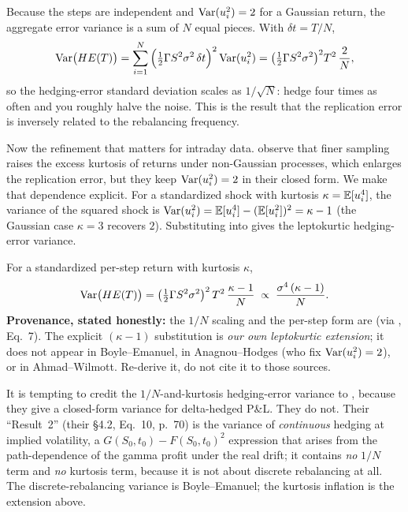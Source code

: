 Because the steps are independent and $\operatorname{Var}(u_i^2) = 2$ for a Gaussian return, the aggregate error variance is a sum of $N$ equal pieces. With $\delta t = T/N$,
\begin{equation}
\label{eq:ivrv:he-gaussian}
\operatorname{Var}\!\big(HE(T)\big) = \sum_{i=1}^{N}\Big(\tfrac{1}{2}\Gamma S^2\sigma^2\,\delta t\Big)^2 \operatorname{Var}(u_i^2)
= \big(\tfrac{1}{2}\Gamma S^2\sigma^2\big)^2 T^2\,\frac{2}{N},
\end{equation}
so the hedging-error standard deviation scales as $1/\sqrt{N}$: hedge four times as often and you roughly halve the noise. This is the \citet{BoyleEmanuel1980} result that the replication error is inversely related to the rebalancing frequency.

Now the refinement that matters for intraday data. \citet{AnagnouHodges2007} observe that finer sampling raises the excess kurtosis of returns under non-Gaussian processes, which enlarges the replication error, but they keep $\operatorname{Var}(u_i^2) = 2$ in their closed form. We make that dependence explicit. For a standardized shock with kurtosis $\kappa = \mathbb{E}[u_i^4]$, the variance of the squared shock is $\operatorname{Var}(u_i^2) = \mathbb{E}[u_i^4] - (\mathbb{E}[u_i^2])^2 = \kappa - 1$ (the Gaussian case $\kappa = 3$ recovers $2$). Substituting into  gives the leptokurtic hedging-error variance.

\begin{keyresult}
For a standardized per-step return with kurtosis $\kappa$,
\begin{equation}
\label{eq:ivrv:kappa-inflation}
\operatorname{Var}\!\big(HE(T)\big) = \big(\tfrac{1}{2}\Gamma S^2\sigma^2\big)^2\, T^2\,\frac{\kappa - 1}{N}
\;\propto\; \frac{\sigma^4\,(\kappa - 1)}{N}.
\end{equation}
\textbf{Provenance, stated honestly:} the $1/N$ scaling and the per-step form are \citet{BoyleEmanuel1980} (via \citealp{AnagnouHodges2007}, Eq.~7). The explicit $(\kappa-1)$ substitution is \emph{our own leptokurtic extension}; it does not appear in Boyle--Emanuel, in Anagnou--Hodges (who fix $\operatorname{Var}(u_i^2)=2$), or in Ahmad--Wilmott. Re-derive it, do not cite it to those sources.
\end{keyresult}

\begin{warning}
It is tempting to credit the $1/N$-and-kurtosis hedging-error variance to \citet{AhmadWilmott2005}, because they give a closed-form variance for delta-hedged P\&L. They do not. Their ``Result~2'' (their \S4.2, Eq.~10, p.~70) is the variance of \emph{continuous} hedging at implied volatility, a $G(S_0,t_0) - F(S_0,t_0)^2$ expression that arises from the path-dependence of the gamma profit under the real drift; it contains \emph{no} $1/N$ term and \emph{no} kurtosis term, because it is not about discrete rebalancing at all. The discrete-rebalancing variance is Boyle--Emanuel; the kurtosis inflation is the extension above.
\end{warning}

